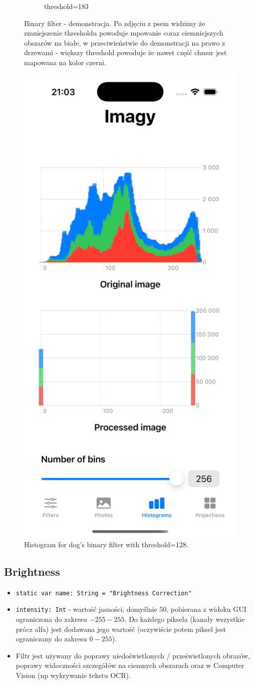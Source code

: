 \documentclass[a4paper]{article}
\begin{document}
\begin{figure}[H]
\begin{subfigure}{0.2\textwidth}
        \caption{threshold=183}
        \label{fig:trees_binary_183}
    \end{subfigure}
    \caption{Binary filter - demonstracja. Po zdjęciu z psem widzimy że zmniejszenie thresholdu powoduje mpowanie coraz ciemniejszych obszarów na białe, w przeciwieństwie do demonstracji na prawo z drzewami - większy threshold powoduje że nawet część chmur jest mapowana na kolor czerni.}
    \label{fig:binary}
\end{figure}

\begin{figure}[H]
    \centering
    \includegraphics[width=0.25\linewidth]{images/dog_binary_histogram.png}
    \caption{Histogram for dog's binary filter with threshold=128.}
    \label{fig:dog_binary_histogram}
\end{figure}

\subsection{Brightness}

\begin{itemize}
    \item \texttt{static var name: String = "Brightness Correction"}
    \item \texttt{intensity: Int} - wartość jasności, domyślnie $50$, pobierana z widoku GUI ograniczona do zakresu $-255-255$. Do każdego piksela (kanały wszystkie prócz alfa) jest dodawana jego wartość (oczywiście potem piksel jest ograniczany do zakresu $0-255$).
    \item Filtr jest używany do poprawy niedoświetlonych / prześwietlonych obrazów, poprawy widoczności szczegółów na ciemnych obszarach oraz w Computer Vision (np wykrywanie tekstu OCR).
\end{itemize}
\end{document}

